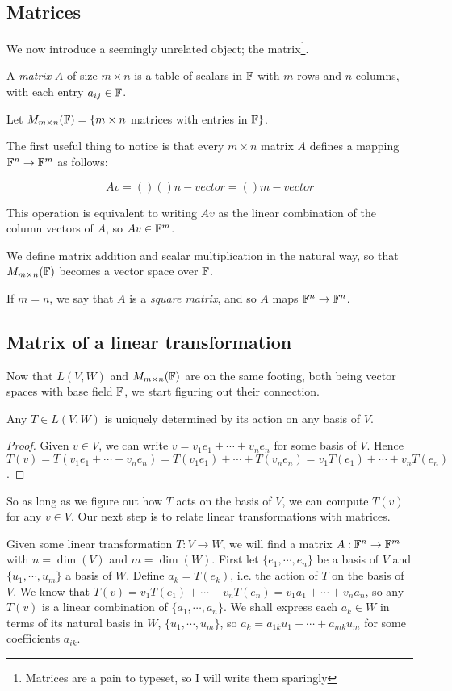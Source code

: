 \subsection{Matrices}
We now introduce a seemingly unrelated object; the matrix\footnote{Matrices are a pain to typeset, so I will write them sparingly}.

\begin{definition}
  A \emph{matrix} $A$ of size $m\times n$ is a table of scalars in $\mathbb{F}$ with $m$ rows and $n$ columns, with each entry $a_{ij}\in\mathbb{F}$.
\end{definition}

Let $M_{m\times n}(\mathbb{F})=\{m\times n$ matrices with entries in $\mathbb{F}\}$.

The first useful thing to notice is that every $m\times n$ matrix $A$ defines a mapping $\mathbb{F}^n\to\mathbb{F}^m$ as follows:

\[
Av = ()() n-vector = () m-vector
\]

This operation is equivalent to writing $Av$ as the linear combination of the column vectors of $A$, so $Av\in\mathbb{F}^m$.

We define matrix addition and scalar multiplication in the natural way, so that $M_{m\times n}(\mathbb{F})$ becomes a vector space over $\mathbb{F}$.

If $m=n$, we say that $A$ is a \emph{square matrix}, and so $A$ maps $\mathbb{F}^n\to\mathbb{F}^n$.


\subsection{Matrix of a linear transformation}
Now that $L(V,W)$ and $M_{m\times n}(\mathbb{F})$ are on the same footing, both being vector spaces with base field $\mathbb{F}$, we start figuring out their connection.

\begin{lemma}
  Any $T\in L(V,W)$ is uniquely determined by its action on any basis of $V$.
\end{lemma}
\begin{proof}
  Given $v\in V$, we can write $v=v_1e_1+\cdots+v_ne_n$ for some basis of $V$. Hence $T(v)=T(v_1e_1+\cdots+v_ne_n)=T(v_1e_1)+\cdots+T(v_ne_n)=v_1T(e_1)+\cdots+v_nT(e_n)$.
\end{proof}

So as long as we figure out how $T$ acts on the basis of $V$, we can compute $T(v)$ for any $v\in V$. Our next step is to relate linear transformations with matrices.

Given some linear transformation $T:V\to W$, we will find a matrix $A:\mathbb{F}^n\to\mathbb{F}^m$ with $n=\dim(V)$ and $m=\dim(W)$. First let $\{e_1,\cdots,e_n\}$ be a basis of $V$ and $\{u_1, \cdots, u_m\}$ a basis of $W$. Define $a_k=T(e_k)$, i.e. the action of $T$ on the basis of $V$. We know that $T(v)=v_1T(e_1) + \cdots + v_nT(e_n) = v_1a_1 + \cdots + v_n a_n$, so any $T(v)$ is a linear combination of $\{a_1,\cdots,a_n\}$. We shall express each $a_k\in W$ in terms of its natural basis in $W$, $\{u_1,\cdots,u_m\}$, so $a_k=a_{1k}u_1 + \cdots + a_{mk}u_m$ for some coefficients $a_{ik}$.

